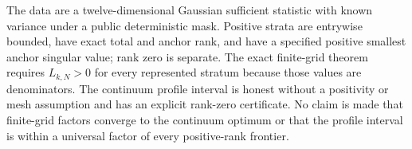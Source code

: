 The data are a twelve-dimensional Gaussian sufficient statistic with known variance under a public deterministic mask.  Positive strata are entrywise bounded, have exact total and anchor rank, and have a specified positive smallest anchor singular value; rank zero is separate.  The exact finite-grid theorem requires \(L_{k,N}>0\) for every represented stratum because those values are denominators.  The continuum profile interval is honest without a positivity or mesh assumption and has an explicit rank-zero certificate.  No claim is made that finite-grid factors converge to the continuum optimum or that the profile interval is within a universal factor of every positive-rank frontier.